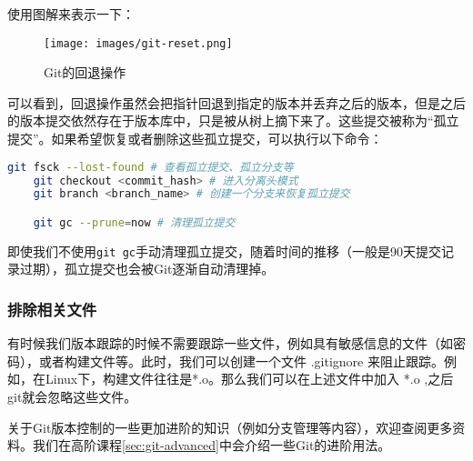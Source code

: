 \documentclass[../main.tex]{subfiles}
\begin{document}
使用图解来表示一下：
\begin{figure}[htbp]
  \centering
  \texttt{[image: images/git-reset.png]}
  \caption{Git的回退操作}
  \label{fig:git-reset}
\end{figure}
可以看到，回退操作虽然会把指针回退到指定的版本并丢弃之后的版本，但是之后的版本提交依然存在于版本库中，只是被从树上摘下来了。这些提交被称为“孤立提交”。如果希望恢复或者删除这些孤立提交，可以执行以下命令：
\begin{lstlisting}[language=bash]
    git fsck --lost-found # 查看孤立提交、孤立分支等
    git checkout <commit_hash> # 进入分离头模式
    git branch <branch_name> # 创建一个分支来恢复孤立提交

    git gc --prune=now # 清理孤立提交
\end{lstlisting}
即使我们不使用\texttt{git gc}手动清理孤立提交，随着时间的推移（一般是90天提交记录过期），孤立提交也会被Git逐渐自动清理掉。

\subsubsection{排除相关文件}

有时候我们版本跟踪的时候不需要跟踪一些文件，例如具有敏感信息的文件（如密码），或者构建文件等。此时，我们可以创建一个文件 .gitignore 来阻止跟踪。例如，在Linux下，构建文件往往是*.o。那么我们可以在上述文件中加入 *.o ,之后git就会忽略这些文件。

关于Git版本控制的一些更加进阶的知识（例如分支管理等内容），欢迎查阅更多资料。我们在高阶课程\ref{sec:git-advanced}中会介绍一些Git的进阶用法。
\end{document}
